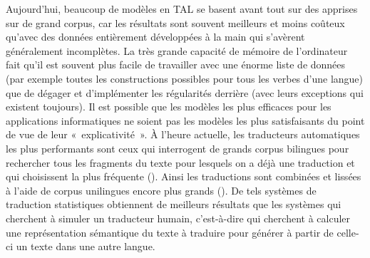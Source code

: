 Aujourd’hui, beaucoup de modèles en TAL se basent avant tout sur des   apprises sur de grand corpus, car les résultats sont souvent meilleurs et moins coûteux qu’avec des données entièrement développées à la main qui s’avèrent généralement incomplètes. La très grande capacité de mémoire de l’ordinateur fait qu’il est souvent plus facile de travailler avec une énorme liste de données (par exemple toutes les constructions possibles pour tous les verbes d’une langue) que de dégager et d’implémenter les régularités derrière (avec leurs exceptions qui existent toujours). Il est possible que les modèles les plus efficaces pour les applications informatiques ne soient pas les modèles les plus satisfaisants du point de vue de leur «~explicativité~». À l’heure actuelle, les traducteurs automatiques les plus performants sont ceux qui interrogent de grands corpus bilingues pour rechercher tous les fragments du texte pour lesquels on a déjà une traduction et qui choisissent la plus fréquente (). Ainsi les traductions sont combinées et lissées à l’aide de corpus unilingues encore plus grands (). De tels systèmes de traduction statistiques obtiennent de meilleurs résultats que les systèmes qui cherchent à simuler un traducteur humain, c’est-à-dire qui cherchent à calculer une représentation sémantique du texte à traduire pour générer à partir de celle-ci un texte dans une autre langue.

